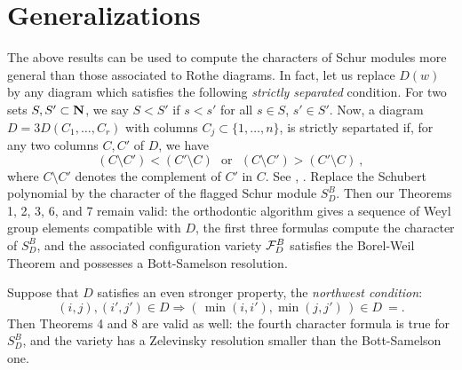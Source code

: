 \section{Generalizations}

The above results can be used to compute the characters
of  Schur modules more general than those associated to
Rothe diagrams.  In fact, let us replace $D(w)$ by any diagram
which satisfies
the following {\em strictly separated} condition.
For two sets $S, S' \subset {\bf N}$, we say $S < S'$ if $s < s'$ for all
$s \in S$, $s' \in S'$.
Now, a diagram $D =3D (C_1, \ldots , C_r)$ with
columns $C_j \subset \{1,\ldots,n\}$,
is strictly separtated if,
for any two columns $C, C'$ of $D$, we have
$$
(C \setminus C') < (C' \setminus C)
\ \ \ \mbox{or} \ \ \
(C \setminus C') > (C' \setminus C) \ ,
$$
where $C\setminus C'$ denotes the complement of $C'$ in $C$.
See \cite{LZ}, \cite{BFZ}.
Replace the Schubert polynomial by the character of the
flagged Schur module $S_D^B$.
Then our Theorems 1, 2, 3, 6, and 7 remain valid:
the orthodontic algorithm gives a sequence of Weyl group
elements compatible with $D$, the first three formulas compute the
character of $S_D^B$, and the associated configuration variety
${ \cal F }_D^B$ satisfies the Borel-Weil Theorem and possesses a Bott-Samelson
resolution.

Suppose that $D$ satisfies an even stronger property, the
{\em northwest condition}:
$$
(i,j), (i',j') \in D \Rightarrow (\, \min(i,i'), \min(j,j')\, ) \in D \ =
.
$$
Then Theorems 4 and 8 are valid as well:
the fourth character formula is true for $S_D^B$, and the
variety has a Zelevinsky resolution smaller than the Bott-Samelson one.



